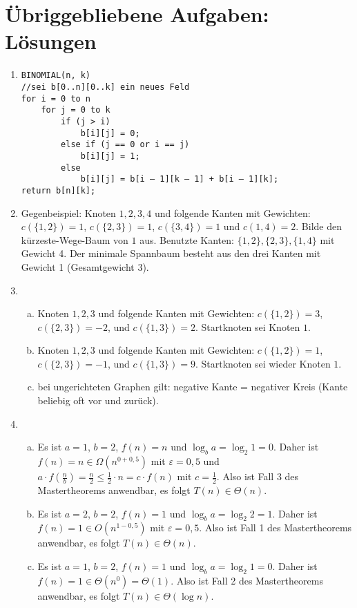 \documentclass{scrartcl}
\begin{document}
\section*{Übriggebliebene Aufgaben: Lösungen}
\begin{enumerate}[(1)]

\item \begin{verbatim}BINOMIAL(n, k)
//sei b[0..n][0..k] ein neues Feld
for i = 0 to n
    for j = 0 to k
        if (j > i)
            b[i][j] = 0;
        else if (j == 0 or i == j)
            b[i][j] = 1;
        else
            b[i][j] = b[i – 1][k – 1] + b[i – 1][k];
return b[n][k];
\end{verbatim}

\item Gegenbeispiel: Knoten $1,2,3,4$ und folgende Kanten mit Gewichten: $c(\{1,2\})=1$, $c(\{2,3\})=1$, $c(\{3,4\})=1$ und $c({1,4})=2$.
Bilde den k\"urzeste-Wege-Baum von $1$ aus. Benutzte Kanten: $\{1,2\}, \{2,3\}, \{1,4\}$ mit Gewicht 4.
Der minimale Spannbaum besteht aus den drei Kanten mit Gewicht 1 (Gesamtgewicht 3).

\item \begin{enumerate}[(a)]
\item Knoten $1,2,3$ und folgende Kanten mit Gewichten: $c(\{1,2\})=3$, $c(\{2,3\})=-2$, und $c(\{1,3\})=2$. Startknoten sei Knoten $1$.
\item Knoten $1,2,3$ und folgende Kanten mit Gewichten: $c(\{1,2\})=1$, $c(\{2,3\})=-1$, und $c(\{1,3\})=9$. Startknoten sei wieder Knoten $1$.
\item bei ungerichteten Graphen gilt: negative Kante = negativer Kreis (Kante beliebig oft vor und zur\"uck).
\end{enumerate}

\item \begin{enumerate}[(a)]
\item Es ist $a=1$, $b=2$, $f(n)=n$ und $\log_b a=\log_2 1=0$. Daher ist $f(n)=n\in \Omega(n^{0+0,5})$ mit $\varepsilon = 0,5$ und $a\cdot f(\frac{n}{b})=\frac{n}{2}\leq \frac{1}{2}\cdot n = c\cdot f(n)$ mit $c=\frac{1}{2}$. Also ist Fall 3 des Mastertheorems anwendbar, es folgt $T(n)\in\Theta(n)$.
\item Es ist $a=2$, $b=2$, $f(n)=1$ und $\log_b a=\log_2 2=1$. Daher ist $f(n)=1\in O(n^{1-0,5})$ mit $\varepsilon=0,5$. Also ist Fall 1 des Mastertheorems anwendbar, es folgt $T(n)\in\Theta(n)$.
\item Es ist $a=1$, $b=2$, $f(n)=1$ und $\log_b a=\log_2 1=0$. Daher ist $f(n)=1\in \Theta(n^0)=\Theta(1)$. Also ist Fall 2 des Mastertheorems anwendbar, es folgt $T(n)\in\Theta(\log n)$.
\end{enumerate}


\end{enumerate}
\end{document}
